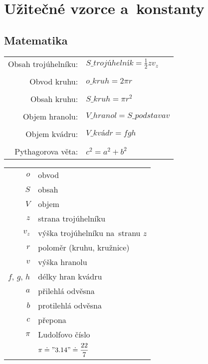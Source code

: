 \documentclass[vyfuk,\classoptions]{fksgeneric}
\begin{document}
\section{Užitečné vzorce a~konstanty}

\subsection{Matematika}

\begin{framed}
\begin{multicols}{2}
\vspace{-1.5cm}
\begin{center}
\begin{tabular}{ r l}

Obsah trojúhelníku: & $S\_{trojúhelník} = \frac{1}{2} z v_z$ \\\\
Obvod kruhu: & $o\_{kruh} = 2 \pi r$ \\\\
Obsah kruhu: & $S\_{kruh} = \pi r^{2}$ \\\\
Objem hranolu: & $V\_{hranol} = S\_{podstava} v$ \\\\
Objem kvádru: & $V\_{kvádr} = fgh$\\\\
Pythagorova věta: & $c^{2} = a^{2} + b^{2}$
\end{tabular}
\end{center}

\columnbreak

\begin{center}
\begin{tabular}{ r l }
  
$o$ & obvod \\
$S$ & obsah \\
$V$ & objem \\
$z$ & strana trojúhelníku \\
$v_z$ & výška trojúhelníku na~stranu $z$\\
$r$ & poloměr (kruhu, kružnice) \\
$v$ & výška hranolu \\
$f$, $g$, $h$ & délky hran kvádru\\	
$a$ & přilehlá odvěsna \\
$b$ & protilehlá odvěsna \\
$c$ & přepona\\
$\pi$ & Ludolfovo číslo\\
& $\pi \doteq "3.14" \doteq \dfrac{22}{7}$

\end{tabular}
\end{center}
\end{multicols}

\end{framed}
\end{document}
